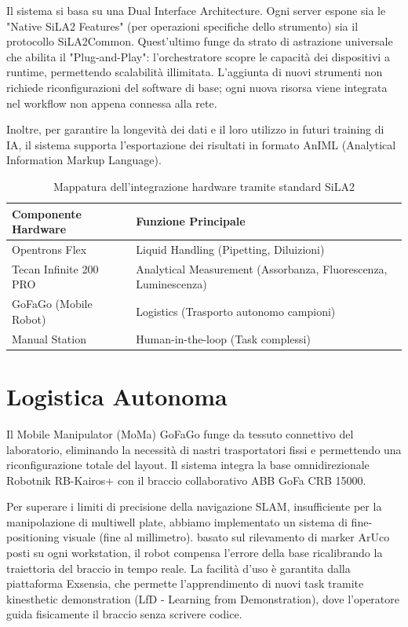 \documentclass[11pt,a4paper]{article}
\begin{document}
	Il sistema si basa su una Dual Interface Architecture. Ogni server espone sia le "Native SiLA2 Features" (per operazioni specifiche dello strumento) sia il protocollo SiLA2Common. Quest'ultimo funge da strato di astrazione universale che abilita il "Plug-and-Play": l'orchestratore scopre le capacità dei dispositivi a runtime, permettendo scalabilità illimitata. L'aggiunta di nuovi strumenti non richiede riconfigurazioni del software di base; ogni nuova risorsa viene integrata nel workflow non appena connessa alla rete.
	
	 Inoltre, per garantire la longevità dei dati e il loro utilizzo in futuri training di IA, il sistema supporta l'esportazione dei risultati in formato AnIML (Analytical Information Markup Language).

	
	\begin{table}[h!]
		\centering
		\renewcommand{\arraystretch}{1.3}
		\begin{tabularx}{\textwidth}{@{} l X @{}}
			\toprule
			\textbf{Componente Hardware} & \textbf{Funzione Principale} \\ \midrule
			Opentrons Flex & Liquid Handling (Pipetting, Diluizioni) \\
			Tecan Infinite 200 PRO &  Analytical Measurement (Assorbanza, Fluorescenza, Luminescenza) \\
			GoFaGo (Mobile Robot) & Logistics (Trasporto autonomo campioni) \\
			Manual Station & Human-in-the-loop (Task complessi) \\ \bottomrule
		\end{tabularx}
		\caption{Mappatura dell'integrazione hardware tramite standard SiLA2}
	\end{table}
	

	\section{Logistica Autonoma}
	Il Mobile Manipulator (MoMa) GoFaGo funge da tessuto connettivo del laboratorio, eliminando la necessità di nastri trasportatori fissi e permettendo una riconfigurazione totale del layout. Il sistema integra la base omnidirezionale Robotnik RB-Kairos+ con il braccio collaborativo ABB GoFa CRB 15000.
	
	Per superare i limiti di precisione della navigazione SLAM, insufficiente per la manipolazione di multiwell plate, abbiamo implementato un sistema di fine-positioning visuale (fine al millimetro). basato sul rilevamento di marker ArUco posti su ogni workstation, il robot compensa l'errore della base ricalibrando la traiettoria del braccio in tempo reale. La facilità d'uso è garantita dalla piattaforma Exsensia, che permette l'apprendimento di nuovi task tramite kinesthetic demonstration (LfD - Learning from Demonstration), dove l'operatore guida fisicamente il braccio senza scrivere codice.
	
\end{document}
